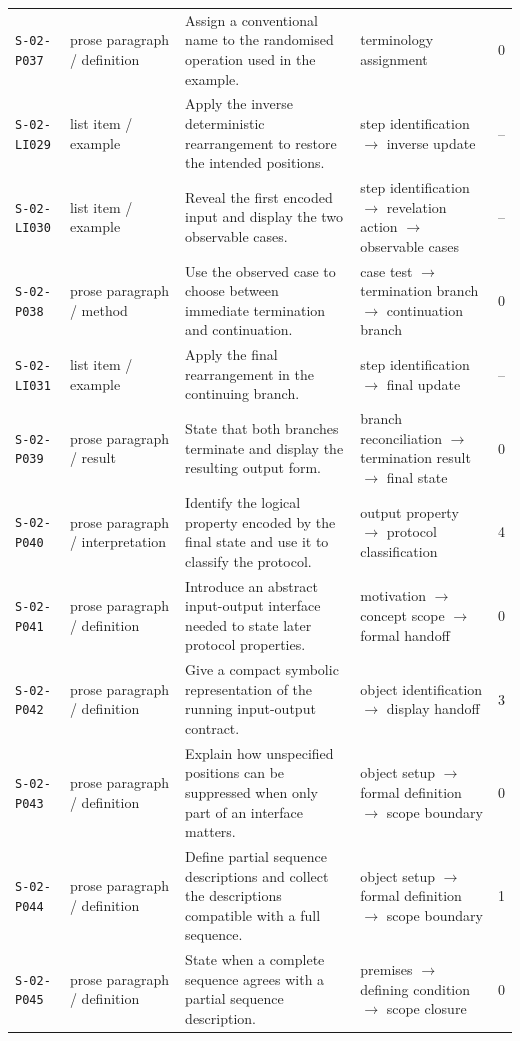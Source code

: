 \documentclass[10pt]{article}
\begin{document}
\begin{longtable}{@{}p{}p{}p{}p{}p{}@{}}
\texttt{S-02-P037}&prose paragraph / definition&Assign a conventional name to the randomised operation used in the example.&terminology assignment&0\\
\texttt{S-02-LI029}&list item / example&Apply the inverse deterministic rearrangement to restore the intended positions.&step identification $\rightarrow$ inverse update&--\\
\texttt{S-02-LI030}&list item / example&Reveal the first encoded input and display the two observable cases.&step identification $\rightarrow$ revelation action $\rightarrow$ observable cases&--\\
\texttt{S-02-P038}&prose paragraph / method&Use the observed case to choose between immediate termination and continuation.&case test $\rightarrow$ termination branch $\rightarrow$ continuation branch&0\\
\texttt{S-02-LI031}&list item / example&Apply the final rearrangement in the continuing branch.&step identification $\rightarrow$ final update&--\\
\texttt{S-02-P039}&prose paragraph / result&State that both branches terminate and display the resulting output form.&branch reconciliation $\rightarrow$ termination result $\rightarrow$ final state&0\\
\texttt{S-02-P040}&prose paragraph / interpretation&Identify the logical property encoded by the final state and use it to classify the protocol.&output property $\rightarrow$ protocol classification&4\\
\texttt{S-02-P041}&prose paragraph / definition&Introduce an abstract input-output interface needed to state later protocol properties.&motivation $\rightarrow$ concept scope $\rightarrow$ formal handoff&0\\
\texttt{S-02-P042}&prose paragraph / definition&Give a compact symbolic representation of the running input-output contract.&object identification $\rightarrow$ display handoff&3\\
\texttt{S-02-P043}&prose paragraph / definition&Explain how unspecified positions can be suppressed when only part of an interface matters.&object setup $\rightarrow$ formal definition $\rightarrow$ scope boundary&0\\
\texttt{S-02-P044}&prose paragraph / definition&Define partial sequence descriptions and collect the descriptions compatible with a full sequence.&object setup $\rightarrow$ formal definition $\rightarrow$ scope boundary&1\\
\texttt{S-02-P045}&prose paragraph / definition&State when a complete sequence agrees with a partial sequence description.&premises $\rightarrow$ defining condition $\rightarrow$ scope closure&0\\

\end{longtable}
\end{document}
